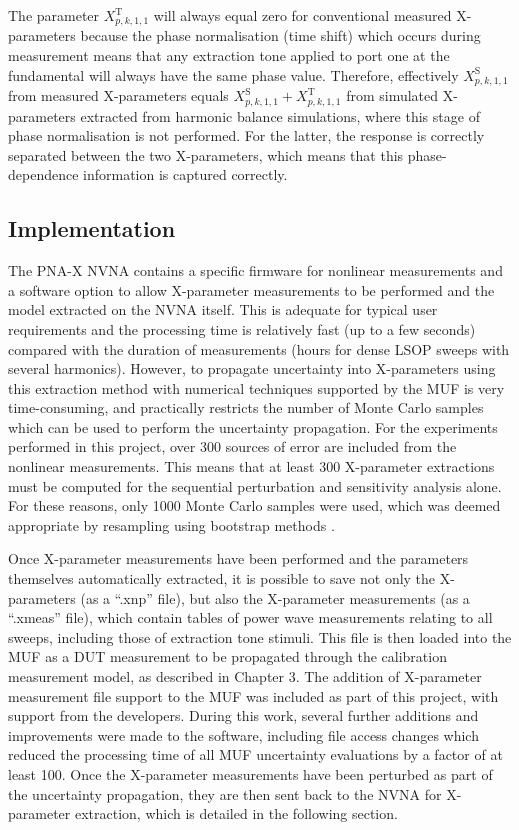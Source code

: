 \documentclass[../thesis/thesis.tex]{subfiles}
\begin{document}
The parameter $X^\textrm{T}_{p,k, 1, 1}$ will always equal zero for conventional measured X-parameters because the phase normalisation (time shift) which occurs during measurement means that any extraction tone applied to port one at the fundamental will always have the same phase value. Therefore, effectively $X^\textrm{S}_{p,k, 1, 1}$ from measured X-parameters equals $X^\textrm{S}_{p,k, 1, 1} + X^\textrm{T}_{p,k, 1, 1}$ from simulated X-parameters extracted from harmonic balance simulations, where this stage of phase normalisation is not performed. For the latter, the response is correctly separated between the two X-parameters, which means that this phase-dependence information is captured correctly. 

\subsection{Implementation}

The PNA-X NVNA contains a specific firmware for nonlinear measurements and a software option to allow X-parameter measurements to be performed and the model extracted on the NVNA itself. This is adequate for typical user requirements and the processing time is relatively fast (up to a few seconds) compared with the duration of measurements (hours for dense LSOP sweeps with several harmonics). However, to propagate uncertainty into X-parameters using this extraction method with numerical techniques supported by the MUF is very time-consuming, and practically restricts the number of Monte Carlo samples which can be used to perform the uncertainty propagation. For the experiments performed in this project, over 300 sources of error are included from the nonlinear measurements. This means that at least 300 X-parameter extractions must be computed for the sequential perturbation and sensitivity analysis alone. For these reasons, only 1000 Monte Carlo samples were used, which was deemed appropriate by resampling using bootstrap methods \cite{Chernick_2008}.

Once X-parameter measurements have been performed and the parameters themselves automatically extracted, it is possible to save not only the X-parameters (as a ``.xnp'' file), but also the X-parameter measurements (as a ``.xmeas'' file), which contain tables of power wave measurements relating to all sweeps, including those of extraction tone stimuli. This file is then loaded into the MUF as a DUT measurement to be propagated through the calibration measurement model, as described in Chapter 3. The addition of X-parameter measurement file support to the MUF was included as part of this project, with support from the developers. During this work, several further additions and improvements were made to the software, including file access changes which reduced the processing time of all MUF uncertainty evaluations by a factor of at least 100. Once the X-parameter measurements have been perturbed as part of the uncertainty propagation, they are then sent back to the NVNA for X-parameter extraction, which is detailed in the following section.
\end{document}
